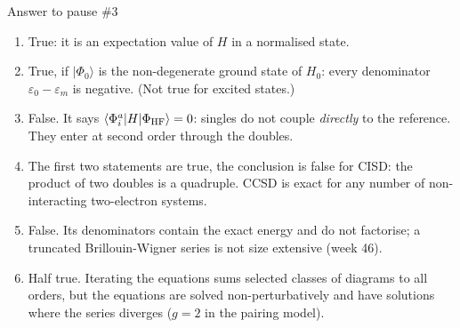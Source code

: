 \documentclass[aspectratio=169,10pt]{beamer}
\newcounter{thinkctr}
\newcommand{\thinka}[1]{%
  \vfill
  \begin{tcolorbox}[enhanced,colback=paleteal,colframe=teal,boxrule=1.2pt,arc=4pt,
    grow to left by=6mm,grow to right by=6mm,
    left=16pt,right=16pt,top=16pt,bottom=18pt,
    fonttitle=\bfseries\Large,fontupper=\large,
    title={Answer to pause \#\thethinkctr}]
  #1
  \end{tcolorbox}
  \vfill}
\newcommand{\ket}[1]{\vert #1\rangle}
\newcommand{\mel}[3]{\langle #1\lvert #2\rvert #3\rangle}
\newcommand{\ph}{\Phi_0}
\begin{document}
\begin{frame}{Answer to pause \#3}
\thinka{\normalsize%
\begin{enumerate}
\item True: it is an expectation value of $H$ in a normalised state.
\item True, if $\ket{\ph}$ is the non-degenerate ground state of $H_0$: every denominator $\varepsilon_0-\varepsilon_m$ is negative. (Not true for excited states.)
\item False. It says $\mel{\Phi_i^a}{H}{\Phi_{\rm HF}}=0$: singles do not couple \emph{directly} to the reference. They enter at second order through the doubles.
\item The first two statements are true, the conclusion is false for CISD: the product of two doubles is a quadruple. CCSD is exact for any number of non-interacting two-electron systems.
\item False. Its denominators contain the exact energy and do not factorise; a truncated Brillouin-Wigner series is not size extensive (week 46).
\item Half true. Iterating the equations sums selected classes of diagrams to all orders, but the equations are solved non-perturbatively and have solutions where the series diverges ($g=2$ in the pairing model).
\end{enumerate}}
\end{frame}
\end{document}
